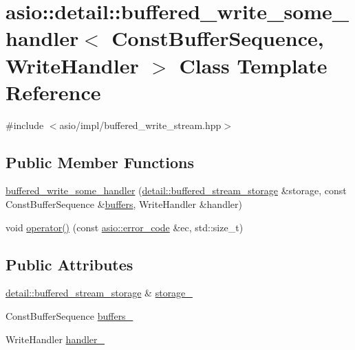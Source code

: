 \hypertarget{classasio_1_1detail_1_1buffered__write__some__handler}{}\section{asio\+:\+:detail\+:\+:buffered\+\_\+write\+\_\+some\+\_\+handler$<$ Const\+Buffer\+Sequence, Write\+Handler $>$ Class Template Reference}
\label{classasio_1_1detail_1_1buffered__write__some__handler}


{\ttfamily \#include $<$asio/impl/buffered\+\_\+write\+\_\+stream.\+hpp$>$}

\subsection*{Public Member Functions}
\begin{DoxyCompactItemize}
\item 
\hyperlink{classasio_1_1detail_1_1buffered__write__some__handler_af2784930fb8df930dfad9cc378b54c23}{buffered\+\_\+write\+\_\+some\+\_\+handler} (\hyperlink{classasio_1_1detail_1_1buffered__stream__storage}{detail\+::buffered\+\_\+stream\+\_\+storage} \&storage, const Const\+Buffer\+Sequence \&\hyperlink{group__async__read_ga54dede45c3175148a77fe6635222c47d}{buffers}, Write\+Handler \&handler)
\item 
void \hyperlink{classasio_1_1detail_1_1buffered__write__some__handler_a006c777b1316275f13d32a3a37be6447}{operator()} (const \hyperlink{classasio_1_1error__code}{asio\+::error\+\_\+code} \&ec, std\+::size\+\_\+t)
\end{DoxyCompactItemize}
\subsection*{Public Attributes}
\begin{DoxyCompactItemize}
\item 
\hyperlink{classasio_1_1detail_1_1buffered__stream__storage}{detail\+::buffered\+\_\+stream\+\_\+storage} \& \hyperlink{classasio_1_1detail_1_1buffered__write__some__handler_a26506a056c3ed5dc287fa2183b4e2174}{storage\+\_\+}
\item 
Const\+Buffer\+Sequence \hyperlink{classasio_1_1detail_1_1buffered__write__some__handler_a3c09e3a75a53b491cbdcaa3c3fe3f4b5}{buffers\+\_\+}
\item 
Write\+Handler \hyperlink{classasio_1_1detail_1_1buffered__write__some__handler_a8a01d41c2ea0751dd1ef511c4ceb17e6}{handler\+\_\+}
\end{DoxyCompactItemize}


